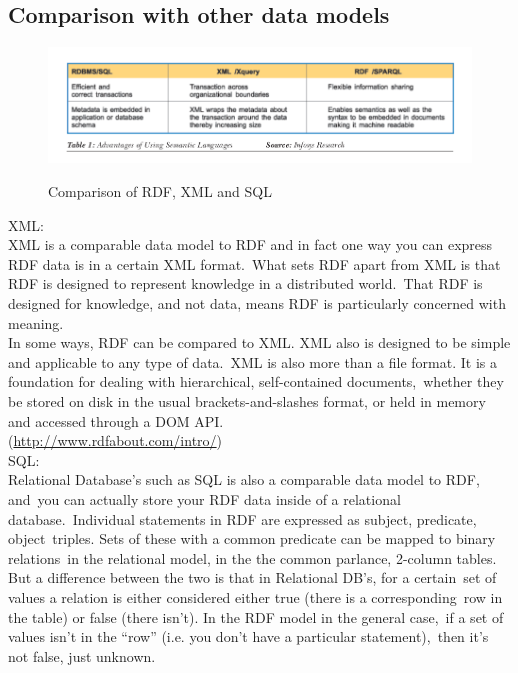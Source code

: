 \documentclass[DIV=calc, paper=a4, fontsize=12pt, onecolumn]{scrartcl}	 %
\begin{document}
  \subsection{Comparison with other data models}

  \begin{figure}[ht!]
    \centering
    \includegraphics[scale=0.5]{sqlrdf.png}
    \caption{Comparison of RDF, XML and SQL}
    \citep[Fig.~1]{parachuri2008role}
    \label{fig:nwhin}
  \end{figure}  

  XML:\\

  \noindent XML is a comparable data model to RDF and in fact one way you can express RDF data is in a certain XML format.\
  What sets RDF apart from XML is that RDF is designed to represent knowledge in a distributed world.\
  That RDF is designed for knowledge, and not data, means RDF is particularly concerned with meaning.\\

  \noindent In some ways, RDF can be compared to XML. XML also is designed to be simple and applicable to any type of data.\
  XML is also more than a file format. It is a foundation for dealing with hierarchical, self-contained documents,\
  whether they be stored on disk in the usual brackets-and-slashes format, or held in memory and accessed through a DOM API.\\
  (\url{http://www.rdfabout.com/intro/})\\

  \noindent SQL: \\

  \noindent Relational Database’s such as SQL is also a comparable data model to RDF, and\
  you can actually store your RDF data inside of a relational database.\
  Individual statements in RDF are expressed as subject, predicate, object\ 
  triples. Sets of these with a common predicate can be mapped to binary relations\
  in the relational model, in the the common parlance, 2-column tables.\\

  \noindent But a difference between the two is that in Relational DB's, for a certain\
  set of values a relation is either considered either true (there is a corresponding\
  row in the table) or false (there isn't). In the RDF model in the general case,\
  if a set of values isn't in the ``row'' (i.e. you don't have a particular statement),\
  then it's not false, just unknown.\\
\end{document}
